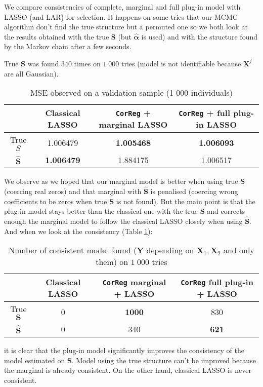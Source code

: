 \documentclass[12pt,a4paper]{report}
\begin{document}
		
		We compare consistencies of complete, marginal and full plug-in model with LASSO (and LAR) for selection.
		It happens on some tries that our MCMC algorithm don't find the true structure but a permuted one so we both look at the results obtained with the true $\boldsymbol{S}$ (but $\hat{\boldsymbol{\alpha}}$ is used) and with the structure found by the Markov chain after a few seconds.
		
		True $\boldsymbol{S}$ was found $340$ times on $1\;000$ tries (model is not identifiable because $\boldsymbol{X}^j$ are all Gaussian).
		
		\begin{table}[h!]
		\centering
		\begin{tabular}{|c|c|c|c|}
		\hline 
		 & Classical LASSO & {\tt CorReg} + marginal LASSO& {\tt CorReg} + full plug-in LASSO\\ 
		\hline 
		True $S$ &  1.006479 & \textbf{1.005468} & \textbf{1.006093} \\ 
		\hline 
		$\hat{\boldsymbol{S}}$ & \textbf{1.006479} & 1.884175 & 1.006517 \\ 
		\hline 
		\end{tabular} 
		\caption{MSE observed on a validation sample (1 000 individuals)}
		\end{table}

		We observe as we hoped that our marginal model is better when using true $\boldsymbol{S}$ (coercing real zeros) and that marginal with $\hat{\boldsymbol{S}}$ is penalised (coercing wrong coefficients to be zeros when true $\boldsymbol{S}$ is not found).
		But the main point is that the plug-in model stays better than the classical one with the true $\boldsymbol{S}$ and corrects enough the marginal model to follow the classical LASSO closely when using $\hat{\boldsymbol{S}}$. 
		And when we look at the consistency (Table \ref{testidentifiableG}):
		\begin{table}[h!]	
		\centering
		\begin{tabular}{|c|c|c|c|}
		\hline 
		 & Classical LASSO & {\tt CorReg}  marginal + LASSO& {\tt CorReg}  full plug-in  + LASSO \\ 
		\hline 
		True $\boldsymbol{S}$ &  0 & \textbf{1000} & 830 \\ 
		\hline 
		$\hat{\boldsymbol{S}}$ & 0 & 340 & \textbf{621} \\ 
		\hline 
		\end{tabular} 
		\caption{Number of consistent model found ($\boldsymbol{Y}$ depending on $\boldsymbol{X}_1,\boldsymbol{X}_2$ and only them) on $1\;000$ tries}\label{testidentifiableG}
		\end{table}				
		it is clear that the plug-in model significantly improves the consistency of the model estimated on $\boldsymbol{S}$. Model using the true structure can't be improved because the marginal is already consistent. On the other hand, classical LASSO is never consistent.\\
		
\end{document}
